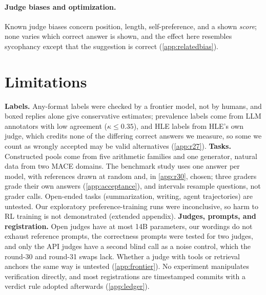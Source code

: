 \documentclass{article}
\begin{document}
\paragraph{Judge biases and optimization.}
Known judge biases concern position, length, self-preference, and a shown \emph{score}; none varies which correct answer is shown, and the effect here resembles sycophancy except that the suggestion is correct (\cref{app:relatedbias}).

\section{Limitations}
\label{sec:limits}

\textbf{Labels.} Any-format labels were checked by a frontier model, not by humans, and boxed replies alone give conservative estimates; prevalence labels come from LLM annotators with low agreement ($\kappa \le 0.35$), and HLE labels from HLE's own judge, which credits none of the differing correct answers we measure, so some we count as wrongly accepted may be valid alternatives (\cref{app:r27}).
\textbf{Tasks.} Constructed pools come from five arithmetic families and one generator, natural data from two \textsc{MACE} domains. The benchmark study uses one answer per model, with references drawn at random and, in \cref{app:r30}, chosen; three graders grade their own answers (\cref{app:acceptance}), and intervals resample questions, not grader calls. Open-ended tasks (summarization, writing, agent trajectories) are untested. Our exploratory preference-training runs were inconclusive, so harm to RL training is not demonstrated (extended appendix).
\textbf{Judges, prompts, and registration.} Open judges have at most 14B parameters, our wordings do not exhaust reference prompts, the correctness prompts were tested for two judges, and only the API judges have a second blind call as a noise control, which the round-30 and round-31 swaps lack. Whether a judge with tools or retrieval anchors the same way is untested (\cref{app:frontier}). No experiment manipulates verification directly, and most registrations are timestamped commits with a verdict rule adopted afterwards (\cref{app:ledger}).
\end{document}
